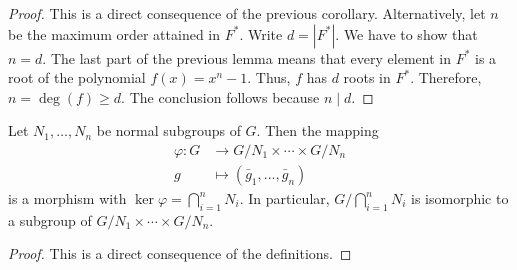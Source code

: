 \begin{proof} This is a direct consequence of the previous corollary. Alternatively, let $n$ be the maximum order attained in $F^*$. Write $d=|F^*|$. We have to show that $n=d$. The last part of the previous lemma means that every element in $F^*$ is a root of the polynomial $f(x)=x^n-1$. Thus, $f$ has $d$ roots in $F^*$. Therefore, $n=\deg(f)\ge d$. The conclusion follows because $n\mid d$.  \end{proof}


\begin{prop}\label{map-to-quotient-product}
    Let\/ $N_1, \dots, N_n$ be normal subgroups of\/ $G$. Then the mapping
    \begin{align*}
        \varphi\colon G &\to G/N_1 \times \cdots \times G/N_n\\
        g &\mapsto (\bar g_1, \dots, \bar g_n)
    \end{align*}
    is a morphism with\/ $\ker\varphi =\bigcap_{i=1}^n N_i$. In particular, $G/\bigcap_{i=1}^n N_i$ is isomorphic to a subgroup of\/ $G/N_1 \times\cdots\times G/N_n$.
\end{prop}

\begin{proof} This is a direct consequence of the definitions.  \end{proof}


